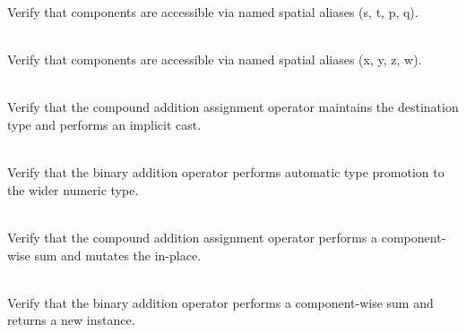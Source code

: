 \begin{DoxyRefList}
\label{test__test000003}%
%
Verify that  components are accessible via named spatial aliases (s, t, p, q).  
\item[{\parbox[t]{\linewidth}{Member \doxylink{group___f_g_m___vec4___access_gaf9b19b8936062eecb39792dd3f286f24}{Vector4\+DAccess\+\_\+\+Accessible\+As\+XYZW} ()}}]\hfill \\
\label{test__test000002}%
%
Verify that  components are accessible via named spatial aliases (x, y, z, w).  
\item[{\parbox[t]{\linewidth}{Member \doxylink{group___f_g_m___vec4___addition_ga86708e36168b75a3f00feaa8834fb0d5}{Vector4\+DAddition\+\_\+\+Mixed\+Type\+Addition\+Assignment\+Does\+Not\+Promote\+Type} ()}}]\hfill \\
\label{test__test000020}%
%
Verify that the compound addition assignment operator maintains the destination type and performs an implicit cast.  
\item[{\parbox[t]{\linewidth}{Member \doxylink{group___f_g_m___vec4___addition_ga95048d1990144009fee5a994b00f37fb}{Vector4\+DAddition\+\_\+\+Mixed\+Type\+Addition\+Promotes\+Type} ()}}]\hfill \\
\label{test__test000019}%
%
Verify that the binary addition operator performs automatic type promotion to the wider numeric type.  
\item[{\parbox[t]{\linewidth}{Member \doxylink{group___f_g_m___vec4___addition_gaef184c525ed937069f321fd4615d3172}{Vector4\+DAddition\+\_\+\+Plus\+Equals\+Operator\+\_\+\+Returns\+Same\+Vector\+With\+Sum} ()}}]\hfill \\
\label{test__test000018}%
%
Verify that the compound addition assignment operator performs a component-\/wise sum and mutates the  in-\/place.  
\item[{\parbox[t]{\linewidth}{Member \doxylink{group___f_g_m___vec4___addition_gaf200031d73ef67d47cf746aa952ed395}{Vector4\+DAddition\+\_\+\+Plus\+Operator\+\_\+\+Returns\+Vector\+Sum} ()}}]\hfill \\
\label{test__test000017}%
%
Verify that the binary addition operator performs a component-\/wise sum and returns a new  instance.  
\item[{\parbox[t]{\linewidth}{Member \doxylink{group___f_g_m___vec4___alias_ga28601b44441df93dee398b8df1d2605a}{Vector4\+DAlias\+\_\+b\+Vec4\+Is\+A4\+DBool\+Vector} ()}}]\hfill \\

\end{DoxyRefList}
